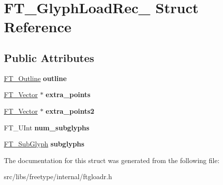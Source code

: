\hypertarget{struct_f_t___glyph_load_rec__}{
\section{FT\_\-GlyphLoadRec\_\- Struct Reference}
\label{struct_f_t___glyph_load_rec__}
}
\subsection*{Public Attributes}
\begin{DoxyCompactItemize}
\item 
\hypertarget{struct_f_t___glyph_load_rec___ae340cdb5263322e86c640b15f82ea72a}{
\hyperlink{struct_f_t___outline__}{FT\_\-Outline} {\bfseries outline}}
\label{struct_f_t___glyph_load_rec___ae340cdb5263322e86c640b15f82ea72a}

\item 
\hypertarget{struct_f_t___glyph_load_rec___ad2547bd6a7c7473d3a4646dfe908f1c3}{
\hyperlink{struct_f_t___vector__}{FT\_\-Vector} $\ast$ {\bfseries extra\_\-points}}
\label{struct_f_t___glyph_load_rec___ad2547bd6a7c7473d3a4646dfe908f1c3}

\item 
\hypertarget{struct_f_t___glyph_load_rec___a5e8bbe62bd889e806700bc0d583ff79b}{
\hyperlink{struct_f_t___vector__}{FT\_\-Vector} $\ast$ {\bfseries extra\_\-points2}}
\label{struct_f_t___glyph_load_rec___a5e8bbe62bd889e806700bc0d583ff79b}

\item 
\hypertarget{struct_f_t___glyph_load_rec___a71dc4ab52b956b974fe65c95a098e03c}{
FT\_\-UInt {\bfseries num\_\-subglyphs}}
\label{struct_f_t___glyph_load_rec___a71dc4ab52b956b974fe65c95a098e03c}

\item 
\hypertarget{struct_f_t___glyph_load_rec___a12ef145fedbeb14cc8b9d320ae3fed96}{
\hyperlink{struct_f_t___sub_glyph_rec__}{FT\_\-SubGlyph} {\bfseries subglyphs}}
\label{struct_f_t___glyph_load_rec___a12ef145fedbeb14cc8b9d320ae3fed96}

\end{DoxyCompactItemize}


The documentation for this struct was generated from the following file:\begin{DoxyCompactItemize}
\item 
src/libs/freetype/internal/ftgloadr.h\end{DoxyCompactItemize}
